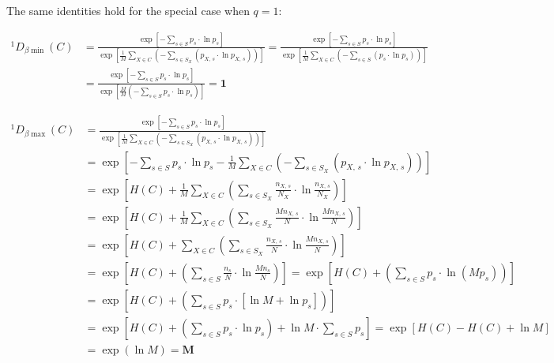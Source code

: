 \noindent The same identities hold for the special case when $q = 1$:

\begin{equation}
\begin{split}
^1D_{\beta\min}(C) & = \frac{\exp\left[-\sum_{s \in S}p_s \cdot\ln p_s\right]}{\exp\left[\frac{1}{M}\sum_{X \in C}\left(-\sum_{s \in S_X}(p_{X,\,s}\cdot\ln p_{X,\,s})\right)\right]} = \frac{\exp\left[-\sum_{s \in S}p_s \cdot\ln p_s\right]}{\exp\left[\frac{1}{M}\sum_{X \in C}\left(-\sum_{s \in S}(p_{s}\cdot\ln p_{s})\right)\right]}\\
& = \frac{\exp\left[-\sum_{s \in S}p_s \cdot\ln p_s\right]}{\exp\left[\frac{M}{M}\left(-\sum_{s \in S}p_{s}\cdot\ln p_{s}\right)\right]} = \boldsymbol{1}
\end{split}
\label{eq:diversity_beta_q1_min}
\end{equation}

\begin{equation}\begin{split}
^1D_{\beta\max}(C)
& = \frac{\exp\left[-\sum_{s \in S}p_s \cdot\ln p_s\right]}{\exp\left[\frac{1}{M}\sum_{X \in C}\left(-\sum_{s \in S_X}(p_{X,\,s}\cdot\ln p_{X,\,s})\right)\right]}\\
& = \exp\left[-\sum_{s \in S}p_s \cdot\ln p_s - \frac{1}{M}\sum_{X \in C}\left(-\sum_{s \in S_X}(p_{X,\,s}\cdot\ln p_{X,\,s})\right)\right]\\
& = \exp\left[H(C) + \frac{1}{M}\sum_{X \in C}\left(\sum_{s \in S_X}\frac{n_{X,\,s}}{N_X}\cdot\ln \frac{n_{X,\,s}}{N_X}\right)\right]\\
& = \exp\left[H(C) + \frac{1}{M}\sum_{X \in C}\left(\sum_{s \in S_X}\frac{Mn_{X,\,s}}{N}\cdot\ln \frac{Mn_{X,\,s}}{N}\right)\right]\\
& = \exp\left[H(C) + \sum_{X \in C}\left(\sum_{s \in S_X}\frac{n_{X,\,s}}{N}\cdot\ln \frac{Mn_{X,\,s}}{N}\right)\right]\\
& = \exp\left[H(C) + \left(\sum_{s \in S}\frac{n_{s}}{N}\cdot\ln \frac{Mn_{s}}{N}\right)\right]
 = \exp\left[H(C) + \left(\sum_{s \in S}p_s\cdot\ln (Mp_s)\right)\right]\\
& = \exp\left[H(C) + \left(\sum_{s \in S}p_s\cdot\left[\ln M + \ln p_s\right]\right)\right]\\
& = \exp\left[H(C) + \left(\sum_{s \in S}p_s\cdot\ln p_s\right)+ \ln M \cdot \sum_{s \in S}p_s\right]
= \exp\left[H(C) - H(C) + \ln M\right]\\
& = \exp(\ln M) = \boldsymbol{M}
\end{split}
\label{eq:diversity_beta_q1_max}
\end{equation}


